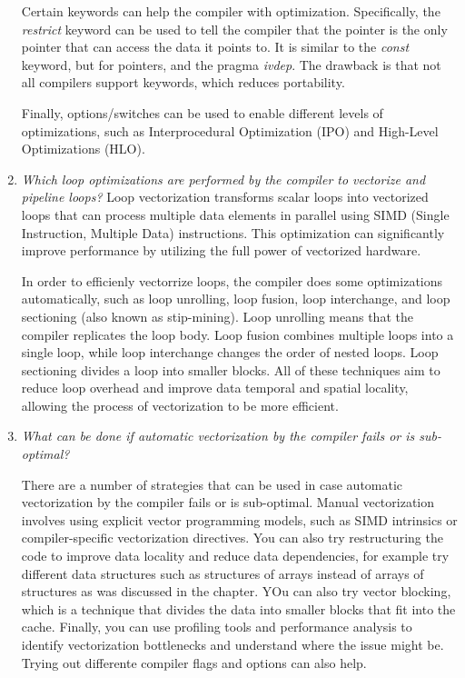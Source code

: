\documentclass[unicode,11pt,a4paper,oneside,numbers=endperiod,openany]{scrartcl}
\begin{document}
\begin{enumerate}
    Certain keywords can help the compiler with optimization. 
    Specifically, the \textit{restrict} keyword can be used to tell the compiler that the pointer is the only
    pointer that can access the data it points to.
    It is similar to the \textit{const} keyword, but for pointers, and the pragma \textit{ivdep}.
    The drawback is that not all compilers support keywords, which reduces portability.

    Finally, options/switches can be used to enable different levels of optimizations, such as 
    Interprocedural Optimization (IPO) and High-Level Optimizations (HLO).

    \item \textit{Which loop optimizations are performed by the compiler to vectorize and pipeline loops?}
    Loop vectorization transforms scalar loops into vectorized loops that can process multiple data elements 
    in parallel using SIMD (Single Instruction, Multiple Data) instructions. This optimization can significantly
    improve performance by utilizing the full power of vectorized hardware.

    In order to efficienly vectorrize loops, the compiler does some optimizations automatically, such as 
    loop unrolling, loop fusion, loop interchange, and loop sectioning (also known as stip-mining). 
    Loop unrolling means that the compiler replicates the loop body. 
    Loop fusion combines multiple loops into a single loop, 
    while loop interchange changes the order of nested loops. 
    Loop sectioning divides a loop into smaller blocks.
    All of these techniques aim to reduce loop overhead and improve data temporal and spatial locality, 
    allowing the process of vectorization to be more efficient.
    
    \item \textit{What can be done if automatic vectorization by the compiler fails or is sub-optimal?}
    
    There are a number of strategies that can be used in case automatic vectorization by the compiler fails or is sub-optimal.
    Manual vectorization involves using explicit vector programming models, such as SIMD intrinsics or 
    compiler-specific vectorization directives.
    You can also try restructuring the code to improve data locality and reduce data dependencies, for example try
    different data structures such as structures of arrays instead of arrays of structures as was discussed in the chapter.
    YOu can also try vector blocking, which is a technique that divides the data into smaller blocks that fit into the cache.
    Finally, you can use profiling tools and performance analysis to identify vectorization bottlenecks and understand
    where the issue might be. Trying out differente compiler flags and options can also help.

\end{enumerate}
\end{document}
